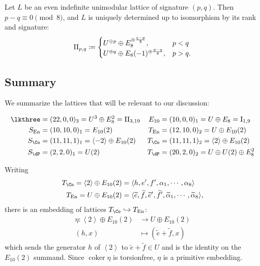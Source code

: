 \documentclass{amsart}
\renewcommand{\tilde}{\widetilde}
\begin{document}
\begin{remark}

Let \(L\) be an even indefinite unimodular lattice of signature \((p, q)\). Then \(p-q\equiv 0 \pmod 8\), and \(L\) is uniquely determined up to isomorphism by its rank and signature: \[ 
{\rm{II}}_{p, q} \coloneqq
\begin{cases}
    U ^{\oplus p}\oplus E_8^{\oplus {q-p\over 8}}, & p < q \\
    U^{\oplus q} \oplus E_8(-1)^{\oplus {p-q\over 8}}, & p > q
.\end{cases}
\]

\end{remark}

\subsection{Summary}\label{summary}

\begin{remark}

We summarize the lattices that will be relevant to our discussion:

\[\begin{aligned}
    \lkthree &= (22, 0, 0)_3 = U^3 \oplus E_8^2 = \rm{II}_{3, 19} &
    E_{10} &= (10, 0, 0)_1 = U \oplus E_8 = \mathrm{I}_{1, 9} \\
    S_{\operatorname{En}} &= (10, 10, 0)_1    = E_{10}(2) & 
    T_{\operatorname{En}} &= (12, 10, 0)_2    = U \oplus E_{10}(2) \\
    S_{\Co} &= (11, 11, 1)_1    = \left\langle{-2}\right\rangle \oplus E_{10}(2) & 
    T_{\Co} &= (11,11,1)_2      = \left\langle{2}\right\rangle \oplus E_{10}(2) \\
    S_{\dP} &= (2,2,0)_1        = U(2) &
    T_{\dP} &= (20, 2, 0)_2     = U \oplus U(2) \oplus E_8^2
\end{aligned}\]

\end{remark}

\begin{lemma}

\label{lem:embedding_eta} Writing \begin{align*} T_{\Co} = \left\langle{2}\right\rangle \oplus E_{10}(2) &= \langle h, e', f',\alpha_1,\cdots, \alpha_8 \rangle \\ T_{\operatorname{En}} = U \oplus E_{10}(2) &= \langle \tilde e,\tilde f,\tilde e',\tilde f',\tilde \alpha_1,\cdots,\tilde \alpha_8\rangle, \end{align*} there is an embedding of lattices \(T_{\Co} \hookrightarrow T_{\operatorname{En}}\): \begin{align*}     \eta: \left\langle{2}\right\rangle \oplus E_{10}(2) &\to U \oplus E_{10}(2) \\     (h, x) &\mapsto (\tilde e + \tilde f, x) \end{align*} which sends the generator \(h\) of \(\left\langle{2}\right\rangle\) to \(\tilde e+\tilde f\in U\) and is the identity on the \(E_{10}(2)\) summand. Since \(\operatorname{coker}\eta\) is torsionfree, \(\eta\) is a primitive embedding.

\end{lemma}
\end{document}
